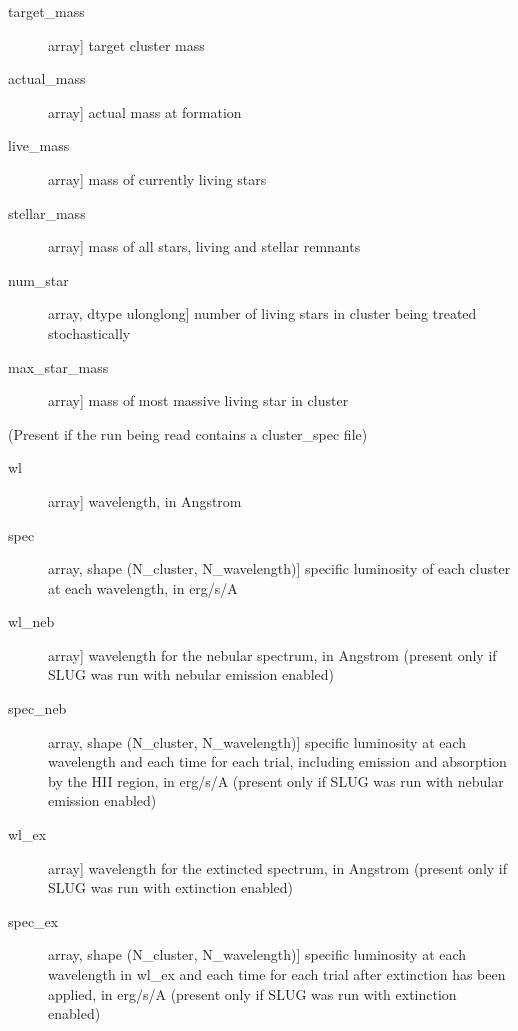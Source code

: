\documentclass[letterpaper,10pt,english]{sphinxmanual}
\begin{document}
\begin{fulllineitems}
\begin{description}
\begin{description}
\item[{target\_mass}] \leavevmode{[}array{]}
target cluster mass

\item[{actual\_mass}] \leavevmode{[}array{]}
actual mass at formation

\item[{live\_mass}] \leavevmode{[}array{]}
mass of currently living stars

\item[{stellar\_mass}] \leavevmode{[}array{]}
mass of all stars, living and stellar remnants

\item[{num\_star}] \leavevmode{[}array, dtype ulonglong{]}
number of living stars in cluster being treated stochastically

\item[{max\_star\_mass}] \leavevmode{[}array{]}
mass of most massive living star in cluster

\end{description}

(Present if the run being read contains a cluster\_spec file)
\begin{description}
\item[{wl}] \leavevmode{[}array{]}
wavelength, in Angstrom

\item[{spec}] \leavevmode{[}array, shape (N\_cluster, N\_wavelength){]}
specific luminosity of each cluster at each wavelength, in erg/s/A

\item[{wl\_neb}] \leavevmode{[}array{]}
wavelength for the nebular spectrum, in Angstrom (present
only if SLUG was run with nebular emission enabled)

\item[{spec\_neb}] \leavevmode{[}array, shape (N\_cluster, N\_wavelength){]}
specific luminosity at each wavelength and each time for each
trial, including emission and absorption by the HII region,
in erg/s/A (present only if SLUG was run with nebular
emission enabled)

\item[{wl\_ex}] \leavevmode{[}array{]}
wavelength for the extincted spectrum, in Angstrom (present
only if SLUG was run with extinction enabled)

\item[{spec\_ex}] \leavevmode{[}array, shape (N\_cluster, N\_wavelength){]}
specific luminosity at each wavelength in wl\_ex and each
time for each trial after extinction has been applied, in
erg/s/A (present only if SLUG was run with extinction
enabled)


\end{description}
\end{description}
\end{fulllineitems}
\end{document}
